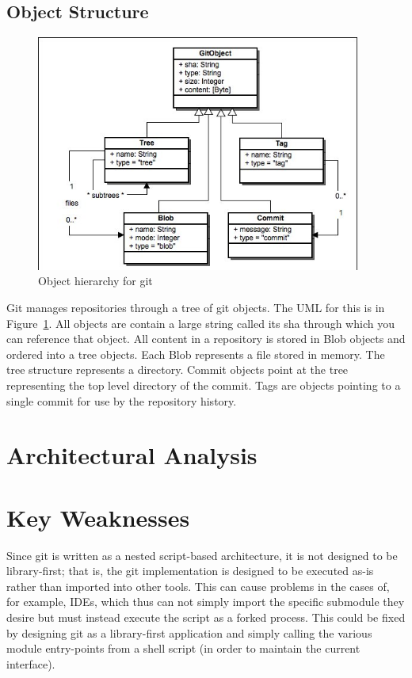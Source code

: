 \documentclass[12pt]{article}
\begin{document}
\subsection{Object Structure}
\begin{figure}[htbp]
\centering
\includegraphics[width=0.95\textwidth]{objects.jpeg}
\caption{Object hierarchy for git}
\label{fig:objects}
\end{figure}

Git manages repositories through a tree of git objects. The UML for this is in Figure~\ref{fig:objects}. All objects are contain a large string called its sha through which you can reference that object. All content in a repository is stored in Blob objects and ordered into a tree objects. Each Blob represents a file stored in memory. The tree structure represents a directory. Commit objects point at the tree representing the top level directory of the commit. Tags are objects pointing to a single commit for use by the repository history.

\section{Architectural Analysis}

\section{Key Weaknesses}
Since git is written as a nested script-based architecture, it is not designed to be library-first; that is, the git implementation is designed to be executed as-is rather than imported into other tools. This can cause problems in the cases of, for example, IDEs, which thus can not simply import the specific submodule they desire but must instead execute the script as a forked process. This could be fixed by designing git as a library-first application and simply calling the various module entry-points from a shell script (in order to maintain the current interface).
\end{document}
